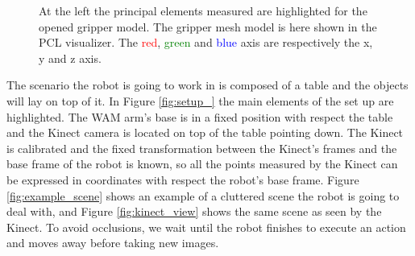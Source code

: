 \begin{figure}[tb]
\centering
\begin{subfigure}[t]{0.25\textwidth}
\centering
{}
\end{subfigure} 
\begin{subfigure}[t]{0.3\textwidth}
\centering
{}
\end{subfigure}
\hspace{1cm}
\begin{subfigure}[t]{0.3\textwidth}
\centering
{}
\end{subfigure}
\caption{At the left the principal elements measured are highlighted for the opened gripper model. The gripper mesh model is here shown in the PCL visualizer. The \textcolor{red}{red}, \textcolor{green}{green} and \textcolor{blue}{blue} axis are respectively the x, y and z axis. }\label{fig:gripper_modelling}
\end{figure}

The scenario the robot is going to work in is composed of a table and the objects will lay on top of it. In Figure \ref{fig:setup_} the main elements of the set up are highlighted. The WAM arm's base is in a fixed position with respect the table and the Kinect camera is located on top of the table pointing down. The Kinect is calibrated and the fixed transformation between the Kinect's frames and the base frame of the robot is known, so all the points measured by the Kinect can be expressed in coordinates with respect the robot's base frame. Figure \ref{fig:example_scene} shows an example of a cluttered scene the robot is going to deal with, and Figure \ref{fig:kinect_view} shows the same scene as seen by the Kinect. %
To avoid occlusions, we wait until the robot finishes to execute an action and moves away before taking new images. 

